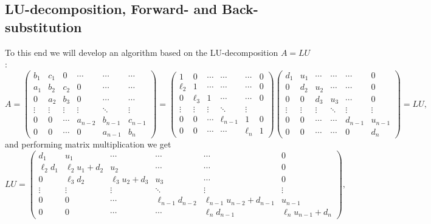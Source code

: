 \documentclass[english,notitlepage]{revtex4-1}  %
\begin{document}
\subsection{LU-decomposition, Forward- and Back-substitution}
To this end we will develop an algorithm based on the LU-decomposition $A = LU$:
\begin{equation} A= 
	\begin{pmatrix}
	b_1 & c_1 & 0 & \cdots & \cdots & \cdots \\
	a_1 & b_2 & c_2 & 0  &\cdots & \cdots  \\ 
	0 & a_2 & b_3 & 0 & \cdots & \cdots \\
	\vdots & \vdots & \vdots & \vdots & \ddots & \vdots \\
	0 & 0 & \cdots & a_{n-2} & b_{n-1} & c_{n-1} \\
	0 & 0 & \cdots  & 0 & a_{n-1} & b_n
	\end{pmatrix}
	= 
	\begin{pmatrix}
	1 & 0 & \cdots &  \cdots & \cdots & 0 \\
	\ell_2 & 1 & \cdots & \cdots & \cdots & 0 \\
	0 & \ell_3 & 1 & \cdots & \cdots & 0 \\
	\vdots & \vdots & \vdots & \ddots & \vdots \\
	0 & 0 & \cdots & \ell_{n-1} & 1 & 0 \\
	0 & 0 & \cdots &\cdots & \ell_n & 1  
	\end{pmatrix}
	\begin{pmatrix}
	d_1 & u_1 & \cdots & \cdots &\cdots & 0 \\ 
	0 & d_2 & u_2 & \cdots & \cdots & 0 \\
	0 & 0 & d_3 & u_3 & \cdots & 0 \\
	\vdots & \vdots & \vdots & \ddots & \vdots & \vdots \\
	0 & 0 & \cdots & \cdots & d_{n-1} & u_{n-1} \\
	0 & 0 & \cdots & \cdots & 0 & d_n
	\end{pmatrix}
	= LU,
\end{equation}
and performing matrix multiplication we get 
\begin{equation}
	LU = 
	\begin{pmatrix}
	d_1 & u_1 & \cdots & \cdots &\cdots & 0 \\ 
	\ell_2d_1 & \ell_2u_1 + d_2 & u_2 & \cdots & \cdots & 0 \\
	0 & \ell_3d_2 & \ell_3u_2 + d_3 & u_3 & \cdots & 0 \\
	\vdots & \vdots & \vdots & \ddots & \vdots & \vdots \\
	0 & 0 & \cdots & \ell_{n-1}d_{n-2} & \ell_{n-1}u_{n-2} + d_{n-1} & u_{n-1} \\
	0 & 0 & \cdots & \cdots & \ell_nd_{n-1} & \ell_n u_{n-1} + d_n
	\end{pmatrix},
\end{equation}
\end{document}
